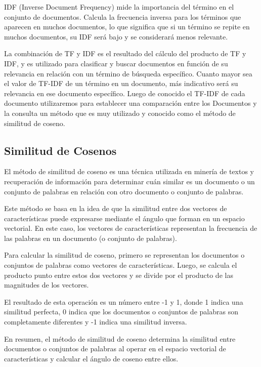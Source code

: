 \documentclass[a4paper,12pt]{article}
\begin{document}
IDF (Inverse Document Frequency) mide la importancia del término en el conjunto de documentos. Calcula la frecuencia inversa para los términos que aparecen en muchos documentos, lo que 
significa que si un término se repite en muchos documentos, su IDF será bajo y se  considerará menos relevante.

La combinación de TF y IDF es el resultado del cálculo del producto de TF y IDF, y es utilizado para clasificar y buscar documentos en función de su relevancia en relación con un término 
de búsqueda específico. Cuanto mayor sea el valor de TF-IDF de un término en un documento, más indicativo será su relevancia en ese documento específico.
Luego de conocido el TF-IDF de cada documento utilizaremos para establecer una comparación entre los Documentos y la consulta un método que es muy utilizado y conocido como el método de similitud de coseno.

\subsection{Similitud de Cosenos}\label{sub:SimilitudDeCoseno}

El método de similitud de coseno es una técnica utilizada en minería de textos y recuperación de información para determinar cuán similar es un documento o un conjunto de palabras en relación con otro documento o conjunto de palabras. 

Este método se basa en la idea de que la similitud entre dos vectores de características puede expresarse mediante el ángulo que forman en un espacio vectorial. En este caso, los vectores de características representan la frecuencia de las palabras en un documento (o conjunto de palabras).

Para calcular la similitud de coseno, primero se representan los documentos o conjuntos de palabras como vectores de características. Luego, se calcula el producto punto entre estos dos vectores y se divide por el producto de las magnitudes de los vectores.

El resultado de esta operación es un número entre -1 y 1, donde 1 indica una similitud perfecta, 0 indica que los documentos o conjuntos de palabras son completamente diferentes y -1 indica una similitud inversa.

En resumen, el método de similitud de coseno determina la similitud entre documentos o conjuntos de palabras al operar en el espacio vectorial de características y calcular el ángulo de coseno entre ellos.


\end{document}

